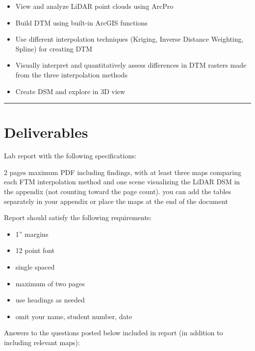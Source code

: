 \documentclass[
]{book}
\providecommand{\tightlist}{%
  \setlength{\itemsep}{0pt}\setlength{\parskip}{0pt}}
\begin{document}
\begin{itemize}
\tightlist
\item
  View and analyze LiDAR point clouds using ArcPro
\item
  Build DTM using built-in ArcGIS functions
\item
  Use different interpolation techniques (Kriging, Inverse Distance Weighting, Spline) for creating DTM
\item
  Visually interpret and quantitatively assess differences in DTM rasters made from the three interpolation methods
\item
  Create DSM and explore in 3D view
\end{itemize}

\begin{center}\rule{0.5\linewidth}{0.5pt}\end{center}

\hypertarget{lab4-deliverables}{%
\section*{Deliverables}\label{lab4-deliverables}}

Lab report with the following specifications:

2 pages maximum PDF including findings, with at least three maps comparing each FTM interpolation method and one scene visualizing the LiDAR DSM in the appendix (not counting toward the page count). you can add the tables separately in your appendix or place the maps at the end of the document

Report should satisfy the following requirements:

\begin{itemize}
\tightlist
\item
  1'' margins
\item
  12 point font
\item
  single spaced
\item
  maximum of two pages
\item
  use headings as needed
\item
  omit your name, student number, date
\end{itemize}

Answers to the questions posted below included in report (in addition to including relevant maps):
\end{document}
